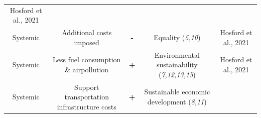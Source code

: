 \documentclass[
]{book}
\begin{document}
\begin{longtable}[]{@{}ccccc@{}}
\begin{minipage}[t]{0.17\columnwidth}
Hosford et al., 2021\strut
\end{minipage}\tabularnewline
\begin{minipage}[t]{0.17\columnwidth}\centering
Systemic\strut
\end{minipage} & \begin{minipage}[t]{0.16\columnwidth}\centering
Additional costs imposed\strut
\end{minipage} & \begin{minipage}[t]{0.17\columnwidth}\centering
\textbf{-}\strut
\end{minipage} & \begin{minipage}[t]{0.17\columnwidth}\centering
Equality (\emph{5,10})\strut
\end{minipage} & \begin{minipage}[t]{0.17\columnwidth}\centering
Hosford et al., 2021\strut
\end{minipage}\tabularnewline
\begin{minipage}[t]{0.17\columnwidth}\centering
Systemic\strut
\end{minipage} & \begin{minipage}[t]{0.16\columnwidth}\centering
Less fuel consumption \& airpollution\strut
\end{minipage} & \begin{minipage}[t]{0.17\columnwidth}\centering
\textbf{+}\strut
\end{minipage} & \begin{minipage}[t]{0.17\columnwidth}\centering
Environmental sustainability (\emph{7,12,13,15})\strut
\end{minipage} & \begin{minipage}[t]{0.17\columnwidth}\centering
Hosford et al., 2021\strut
\end{minipage}\tabularnewline
\begin{minipage}[t]{0.17\columnwidth}\centering
Systemic\strut
\end{minipage} & \begin{minipage}[t]{0.16\columnwidth}\centering
Support transportation infrastructure costs\strut
\end{minipage} & \begin{minipage}[t]{0.17\columnwidth}\centering
\textbf{+}\strut
\end{minipage} & \begin{minipage}[t]{0.17\columnwidth}\centering
Sustainable economic development (\emph{8,11})\strut
\end{minipage} & \begin{minipage}[t]{0.17\columnwidth}\centering

\end{minipage}
\end{longtable}
\end{document}
